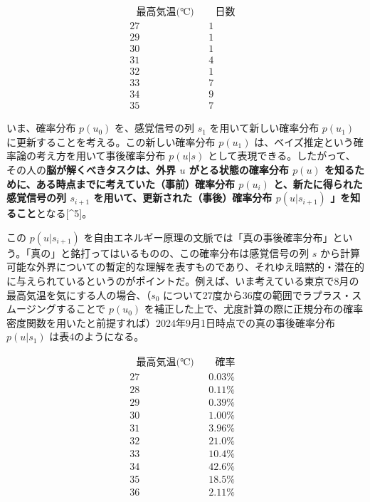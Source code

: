 \[
\begin{array}{cc}
~~~\textrm{最高気温(℃)}~~~ & ~~~\textrm{日数}~~~ \\
\hline
\textrm{27} & \textrm{1} \\
\textrm{29} & \textrm{1} \\
\textrm{30} & \textrm{1} \\
\textrm{31} & \textrm{4} \\
\textrm{32} & \textrm{1} \\
\textrm{33} & \textrm{7} \\
\textrm{34} & \textrm{9} \\
\textrm{35} & \textrm{7}
\end{array}
\tag{表3}
\]

いま、確率分布 \(p(u_0)\) を、感覚信号の列 \(s_1\)
を用いて新しい確率分布 \(p(u_1)\)
に更新することを考える。この新しい確率分布 \(p(u_1)\)
は、ベイズ推定という確率論の考え方を用いて事後確率分布 \(p(u|s)\)
として表現できる。したがって、その人の\textbf{脳が解くべきタスクは、外界
\(u\) がとる状態の確率分布 \(p(u)\)
を知るために、ある時点までに考えていた（事前）確率分布 \(p(u_i)\)
と、新たに得られた感覚信号の列 \(s_{i+1}\)
を用いて、更新された（事後）確率分布 \(p(u|s_{i+1})\)
」を知ること}となる{[}\^{}5{]}。

この \(p(u|s_{i+1})\)
を自由エネルギー原理の文脈では「真の事後確率分布」という。「真の」と銘打ってはいるものの、この確率分布は感覚信号の列
\(s\)
から計算可能な外界についての暫定的な理解を表すものであり、それゆえ暗黙的・潜在的に与えられているというのがポイントだ。例えば、いま考えている東京で8月の最高気温を気にする人の場合、（\(s_0\)
について27度から36度の範囲でラプラス・スムージングすることで \(p(u_0)\)
を補正した上で、尤度計算の際に正規分布の確率密度関数を用いたと前提すれば）2024年9月1日時点での真の事後確率分布
\(p(u|s_1)\) は表4のようになる。

\[
\begin{array}{cc}
~~~\textrm{最高気温(℃)}~~~ & ~~~\textrm{確率}~~~ \\
\hline
\textrm{27} & \textrm{0.03\%} \\
\textrm{28} & \textrm{0.11\%} \\
\textrm{29} & \textrm{0.39\%} \\
\textrm{30} & \textrm{1.00\%} \\
\textrm{31} & \textrm{3.96\%} \\
\textrm{32} & \textrm{21.0\%} \\
\textrm{33} & \textrm{10.4\%} \\
\textrm{34} & \textrm{42.6\%} \\
\textrm{35} & \textrm{18.5\%} \\
\textrm{36} & \textrm{2.11\%}
\end{array}
\tag{表4}
\]

